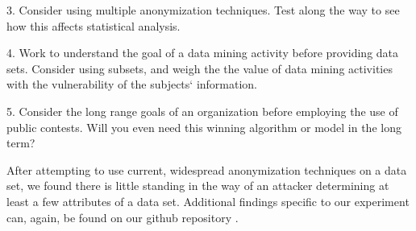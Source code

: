 \documentclass[10pt,journal,compsoc]{IEEEtran}
\begin{document}
3.  Consider using multiple anonymization techniques.  Test along the way to see how this affects statistical analysis.\linebreak

4.  Work to understand the goal of a data mining activity before providing data sets. Consider using subsets, and weigh the the value of data mining activities with the vulnerability of the subjects` information.\linebreak

5.  Consider the long range goals of an organization before employing the use of public contests.  Will you even need this winning algorithm or model in the long term?\linebreak

After attempting to use current, widespread anonymization techniques on a data set, we found there is little standing in the way of an attacker determining at least a few attributes of a data set.  Additional findings specific to our experiment can, again, be found on our github repository \cite{frye}.
%
%

\end{document}

